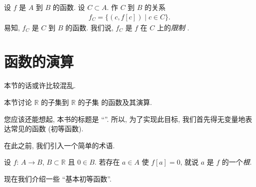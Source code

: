 \begin{definition}
    设 $f$ 是 $A$ 到 $B$ 的函数.
    设 $C \subset A$.
    作 $C$ 到 $B$ 的关系
    \begin{align*}
        f_C = \{ (c, f[c]) \mid c \in C \}.
    \end{align*}
    易知, $f_C$ 是 $C$ 到 $B$ 的函数.
    我们说, $f_C$ 是 $f$ 在 $C$ 上的\emph{限制}%
    .
\end{definition}

\section{函数的演算}

\begin{remark*}
    本节的话或许比较混乱.
\end{remark*}

本节讨论
$\mathbb{R}$ 的子集到 $\mathbb{R}$ 的子集%
的函数及其演算.

您应该还能想起, 本书的标题是 ``\thetitle{}''.
所以, 为了实现此目标,
我们首先得无变量地表达常见的函数 (初等函数).

在此之前, 我们引入一个简单的术语.

\begin{definition}
    设 $f$: $A \to B$, $B \subset \mathbb{R}$ 且 $0 \in B$.
    若存在 $a \in A$ 使 $f[a] = 0$,
    就说 $a$ 是 $f$ 的一个\emph{根}.
\end{definition}

现在我们介绍一些 ``基本初等函数''.

